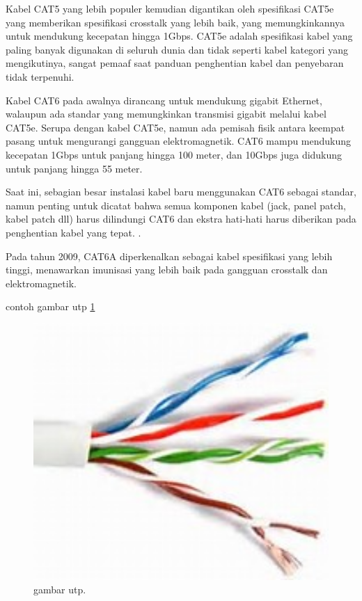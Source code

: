 Kabel CAT5 yang lebih populer kemudian digantikan oleh spesifikasi CAT5e yang memberikan spesifikasi crosstalk yang lebih baik, yang memungkinkannya untuk 
mendukung kecepatan hingga 1Gbps. CAT5e adalah spesifikasi kabel yang paling banyak digunakan di seluruh dunia dan tidak seperti kabel kategori yang 
mengikutinya, sangat pemaaf saat panduan penghentian kabel dan penyebaran tidak terpenuhi.

Kabel CAT6 pada awalnya dirancang untuk mendukung gigabit Ethernet, walaupun ada standar yang memungkinkan transmisi gigabit melalui kabel CAT5e. Serupa 
dengan kabel CAT5e, namun ada pemisah fisik antara keempat pasang untuk mengurangi gangguan elektromagnetik. CAT6 mampu mendukung kecepatan 1Gbps untuk 
panjang hingga 100 meter, dan 10Gbps juga didukung untuk panjang hingga 55 meter.

Saat ini, sebagian besar instalasi kabel baru menggunakan CAT6 sebagai standar, namun penting untuk dicatat bahwa semua komponen kabel (jack, panel patch, 
kabel patch dll) harus dilindungi CAT6 dan ekstra hati-hati harus diberikan pada penghentian kabel yang tepat. .

Pada tahun 2009, CAT6A diperkenalkan sebagai kabel spesifikasi yang lebih tinggi, menawarkan imunisasi yang lebih baik pada gangguan crosstalk dan elektromagnetik.

	contoh gambar utp \ref{utp}
	\begin{figure}[ht]
		\centerline{\includegraphics[width=1\textwidth]{figures/utp.jpg}}
		\caption{gambar utp.}
		\label{utp}
	\end{figure}
	
